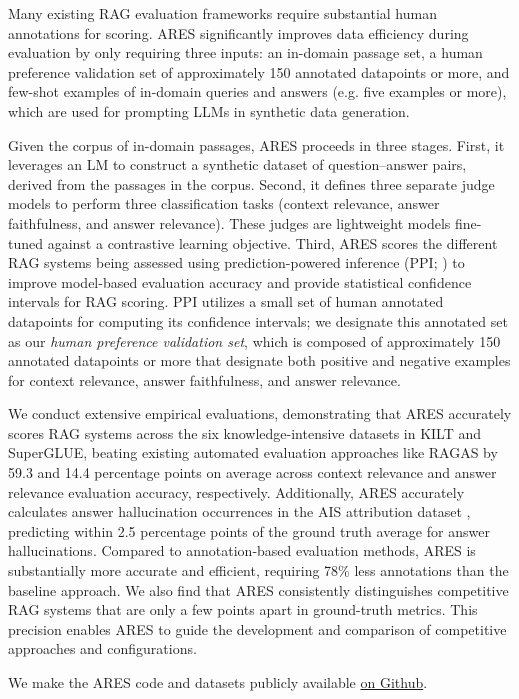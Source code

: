 Many existing RAG evaluation frameworks require substantial human annotations for scoring.
ARES significantly improves data efficiency during evaluation by only requiring three inputs: an in-domain passage set, a human preference validation set of approximately 150 annotated datapoints or more, and few-shot examples of in-domain queries and answers (e.g. five examples or more), which are used for prompting LLMs in synthetic data generation.

Given the corpus of in-domain passages, ARES proceeds in three stages. First, it leverages an LM to construct a synthetic dataset of question--answer pairs, derived from the passages in the corpus. 
Second, it defines three separate judge models to perform three classification tasks (context relevance, answer faithfulness, and answer relevance). These judges are lightweight models fine-tuned against a contrastive learning objective. 
Third, ARES scores the different RAG systems being assessed using prediction-powered inference (PPI; \citealt{angelopoulos2023predictionpowered}) to improve model-based evaluation accuracy and provide statistical confidence intervals for RAG scoring.
PPI utilizes a small set of human annotated datapoints for computing its confidence intervals; we designate this annotated set as our \textit{human preference validation set}, which is composed of approximately 150 annotated datapoints or more that designate both positive and negative examples for context relevance, answer faithfulness, and answer relevance. 





We conduct extensive empirical evaluations, demonstrating that ARES accurately scores RAG systems across the six knowledge-intensive datasets in KILT and SuperGLUE, beating existing automated evaluation approaches like RAGAS by 59.3 and 14.4 percentage points on average across context relevance and answer relevance evaluation accuracy, respectively. 
Additionally, ARES accurately calculates answer hallucination occurrences in the AIS attribution dataset \cite{rashkin2022measuring}, predicting within 2.5 percentage points of the ground truth average for answer hallucinations.
Compared to annotation-based evaluation methods, ARES is substantially more accurate and efficient, requiring 78\% less annotations than the baseline approach.
We also find that ARES consistently distinguishes competitive RAG systems that are only a few points apart in ground-truth metrics. This precision enables ARES to guide the development and comparison of competitive approaches and configurations.

We make the ARES code and datasets publicly available \href{https://github.com/stanford-futuredata/ARES}{on Github}.















